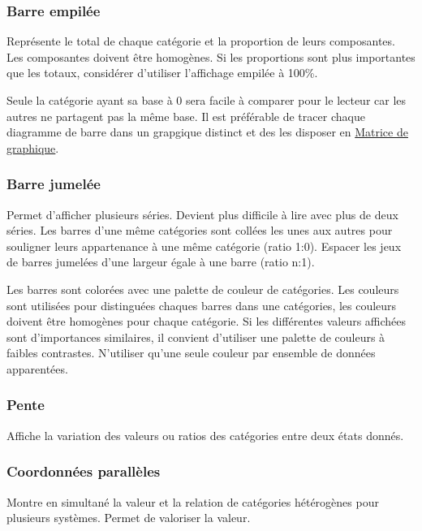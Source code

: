 \documentclass[a4paper,12pt]{article}
\begin{document}
\begin{multicols}{2}
\subsubsection*{Barre empilée}
\label{sec:orge3c6a1b}
Représente le total de chaque catégorie et la proportion de leurs composantes. Les composantes doivent être homogènes. Si les proportions sont plus importantes que les totaux, considérer d'utiliser l'affichage empilée à 100\%. \autocite{mikeyiHowChooseRight2020}

Seule la catégorie ayant sa base à 0 sera facile à comparer pour le lecteur car les autres ne partagent pas la même base.\autocite{jonathanschwabishComparingCategories2021} Il est préférable de tracer chaque diagramme de barre dans un grapgique distinct et des les disposer en \hyperref[sec:org642ccd6]{Matrice de graphique}. \autocite{jonathanschwabishComparingCategories2021}
\subsubsection*{Barre jumelée}
\label{sec:orgca91036}
Permet d'afficher plusieurs séries. Devient plus difficile à lire avec plus de deux séries. \autocite{alansmithLexiqueVisuel}
Les barres d'une même catégories sont collées les unes aux autres pour souligner leurs appartenance à une même catégorie (ratio 1:0). Espacer les jeux de barres jumelées d'une largeur égale à une barre (ratio n:1).

Les barres sont colorées avec une palette de couleur de catégories. Les couleurs sont utilisées pour distinguées chaques barres dans une catégories, les couleurs doivent être homogènes pour chaque catégorie. Si les différentes valeurs affichées sont d'importances similaires, il convient d'utiliser une palette de couleurs à faibles contrastes. N'utiliser qu'une seule couleur par ensemble de données apparentées. \autocite{stephenfewComponentlevelGraphDesign2012}
\subsubsection*{Pente}
\label{sec:org90842aa}
Affiche la variation des valeurs ou ratios des catégories entre deux états donnés. \autocite{alansmithLexiqueVisuel}
\subsubsection*{Coordonnées parallèles}
\label{sec:orgbf12995}
Montre en simultané la valeur et la relation de catégories hétérogènes pour plusieurs systèmes. \autocite{jonathanschwabishRelationship2021} Permet de valoriser la valeur. \autocite{alansmithLexiqueVisuel}


\end{multicols}
\end{document}
